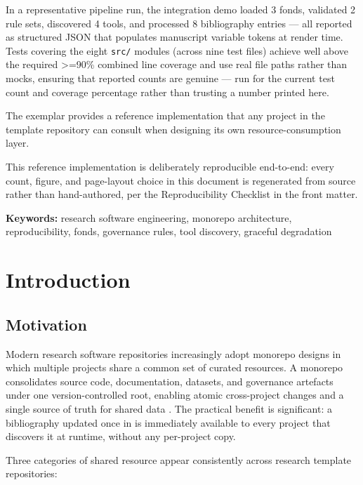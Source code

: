 \documentclass[
]{article}
\begin{document}
In a representative pipeline run, the integration demo loaded 3 fonds,
validated 2 rule sets, discovered 4 tools, and processed 8 bibliography
entries --- all reported as structured JSON that populates manuscript
variable tokens at render time. Tests covering the eight \texttt{src/}
modules (across nine test files) achieve well above the required \texorpdfstring{\textgreater{}=}{>=}90\%
combined line coverage and use real file paths rather than mocks,
ensuring that reported counts are genuine --- run
 for the current test
count and coverage percentage rather than trusting a number printed
here.

The  exemplar provides a reference
implementation that any project in the template repository can consult
when designing its own resource-consumption layer.

This reference implementation is deliberately reproducible end-to-end:
every count, figure, and page-layout choice in this document is
regenerated from source rather than hand-authored, per the
Reproducibility Checklist in the front matter.

\textbf{Keywords:} research software engineering, monorepo architecture,
reproducibility, fonds, governance rules, tool discovery, graceful
degradation

\newpage

\section{Introduction}\label{introduction}

\subsection{Motivation}\label{motivation}

Modern research software repositories increasingly adopt monorepo
designs in which multiple projects share a common set of curated
resources. A monorepo consolidates source code, documentation, datasets,
and governance artefacts under one version-controlled root, enabling
atomic cross-project changes and a single source of truth for shared
data \citep{Fowler2002patterns}. The practical benefit is significant: a
bibliography updated once in
 is immediately
available to every project that discovers it at runtime, without any
per-project copy.

Three categories of shared resource appear consistently across research
template repositories:
\end{document}
